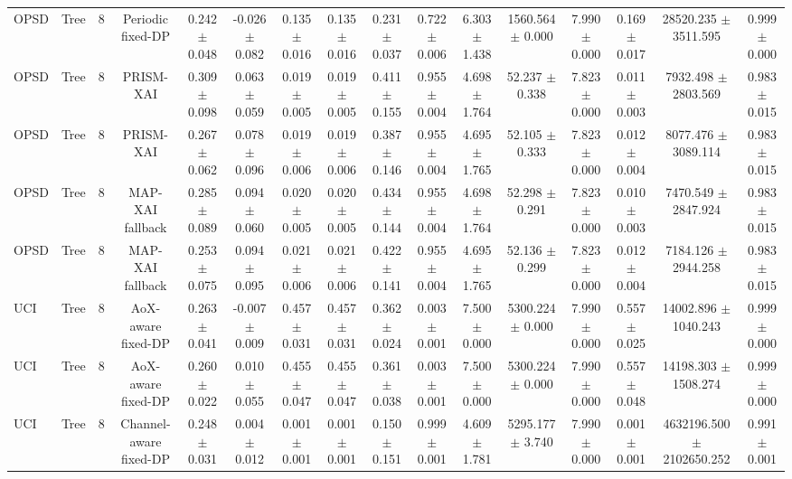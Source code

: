 \begin{tabular}{lccccccccccccccc}
OPSD & Tree & 8 & Periodic fixed-DP & 0.242 $\pm$ 0.048 & -0.026 $\pm$ 0.082 & 0.135 $\pm$ 0.016 & 0.135 $\pm$ 0.016 & 0.231 $\pm$ 0.037 & 0.722 $\pm$ 0.006 & 6.303 $\pm$ 1.438 & 1560.564 $\pm$ 0.000 & 7.990 $\pm$ 0.000 & 0.169 $\pm$ 0.017 & 28520.235 $\pm$ 3511.595 & 0.999 $\pm$ 0.000 \\
OPSD & Tree & 8 & PRISM-XAI & 0.309 $\pm$ 0.098 & 0.063 $\pm$ 0.059 & 0.019 $\pm$ 0.005 & 0.019 $\pm$ 0.005 & 0.411 $\pm$ 0.155 & 0.955 $\pm$ 0.004 & 4.698 $\pm$ 1.764 & 52.237 $\pm$ 0.338 & 7.823 $\pm$ 0.000 & 0.011 $\pm$ 0.003 & 7932.498 $\pm$ 2803.569 & 0.983 $\pm$ 0.015 \\
OPSD & Tree & 8 & PRISM-XAI & 0.267 $\pm$ 0.062 & 0.078 $\pm$ 0.096 & 0.019 $\pm$ 0.006 & 0.019 $\pm$ 0.006 & 0.387 $\pm$ 0.146 & 0.955 $\pm$ 0.004 & 4.695 $\pm$ 1.765 & 52.105 $\pm$ 0.333 & 7.823 $\pm$ 0.000 & 0.012 $\pm$ 0.004 & 8077.476 $\pm$ 3089.114 & 0.983 $\pm$ 0.015 \\
OPSD & Tree & 8 & MAP-XAI fallback & 0.285 $\pm$ 0.089 & 0.094 $\pm$ 0.060 & 0.020 $\pm$ 0.005 & 0.020 $\pm$ 0.005 & 0.434 $\pm$ 0.144 & 0.955 $\pm$ 0.004 & 4.698 $\pm$ 1.764 & 52.298 $\pm$ 0.291 & 7.823 $\pm$ 0.000 & 0.010 $\pm$ 0.003 & 7470.549 $\pm$ 2847.924 & 0.983 $\pm$ 0.015 \\
OPSD & Tree & 8 & MAP-XAI fallback & 0.253 $\pm$ 0.075 & 0.094 $\pm$ 0.095 & 0.021 $\pm$ 0.006 & 0.021 $\pm$ 0.006 & 0.422 $\pm$ 0.141 & 0.955 $\pm$ 0.004 & 4.695 $\pm$ 1.765 & 52.136 $\pm$ 0.299 & 7.823 $\pm$ 0.000 & 0.012 $\pm$ 0.004 & 7184.126 $\pm$ 2944.258 & 0.983 $\pm$ 0.015 \\
UCI & Tree & 8 & AoX-aware fixed-DP & 0.263 $\pm$ 0.041 & -0.007 $\pm$ 0.009 & 0.457 $\pm$ 0.031 & 0.457 $\pm$ 0.031 & 0.362 $\pm$ 0.024 & 0.003 $\pm$ 0.001 & 7.500 $\pm$ 0.000 & 5300.224 $\pm$ 0.000 & 7.990 $\pm$ 0.000 & 0.557 $\pm$ 0.025 & 14002.896 $\pm$ 1040.243 & 0.999 $\pm$ 0.000 \\
UCI & Tree & 8 & AoX-aware fixed-DP & 0.260 $\pm$ 0.022 & 0.010 $\pm$ 0.055 & 0.455 $\pm$ 0.047 & 0.455 $\pm$ 0.047 & 0.361 $\pm$ 0.038 & 0.003 $\pm$ 0.001 & 7.500 $\pm$ 0.000 & 5300.224 $\pm$ 0.000 & 7.990 $\pm$ 0.000 & 0.557 $\pm$ 0.048 & 14198.303 $\pm$ 1508.274 & 0.999 $\pm$ 0.000 \\
UCI & Tree & 8 & Channel-aware fixed-DP & 0.248 $\pm$ 0.031 & 0.004 $\pm$ 0.012 & 0.001 $\pm$ 0.001 & 0.001 $\pm$ 0.001 & 0.150 $\pm$ 0.151 & 0.999 $\pm$ 0.001 & 4.609 $\pm$ 1.781 & 5295.177 $\pm$ 3.740 & 7.990 $\pm$ 0.000 & 0.001 $\pm$ 0.001 & 4632196.500 $\pm$ 2102650.252 & 0.991 $\pm$ 0.001 \\

\end{tabular}
